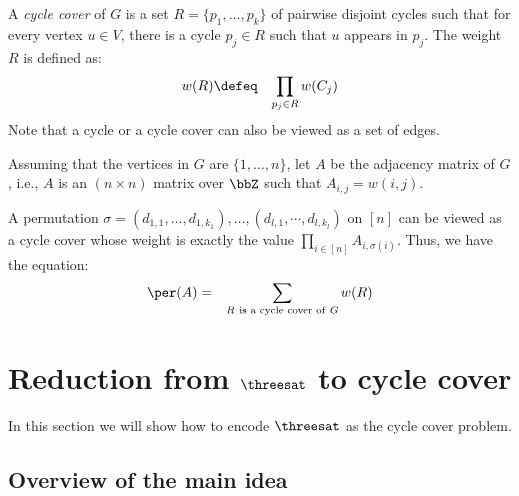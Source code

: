 \documentclass[11pt, a4paper]{article}
\begin{document}
A {\em cycle cover} of $G$ is a set $R=\{p_1,\ldots,p_k\}$ of pairwise disjoint cycles such that
for every vertex $u\in V$, there is a cycle $p_j \in R$ such that $u$ appears in $p_j$.
The weight $R$ is defined as:
\begin{eqnarray*}
w(R) & \defeq & \prod_{p_j \in R} w(C_j)
\end{eqnarray*} 
Note that a cycle or a cycle cover can also be viewed as a set of edges.


Assuming that the vertices in $G$ are $\{1,\ldots,n\}$,
let $A$ be the adjacency matrix of $G$, i.e., $A$ is an $(n\times n)$ matrix over $\bbZ$ such that $A_{i,j}=w(i,j)$.

A permutation $\sigma = (d_{1,1},\ldots,d_{1,k_1}),\ldots,(d_{l,1},\cdots,d_{l,k_l})$ on $[n]$
can be viewed as a cycle cover whose weight is exactly the value $\prod_{i\in [n]} A_{i,\sigma(i)}$.
Thus, we have the equation:
\begin{eqnarray*}
\per(A) & = & \sum_{R \ \text{is a cycle cover of}\ G} w(R)
\end{eqnarray*}


\section{Reduction from $\threesat$ to cycle cover}
\label{sec:red-sat-to-perm}

In this section we will show how to encode $\threesat$ as the cycle cover problem.

\subsection{Overview of the main idea}
\end{document}
